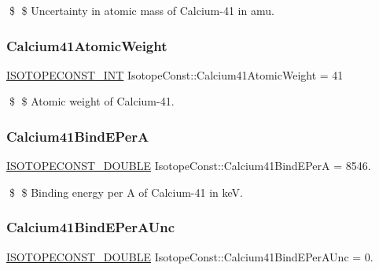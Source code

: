 \$ \$ Uncertainty in atomic mass of Calcium-\/41 in amu. \mbox{\label{group___isotope_const-_calcium-_ca41_gaae3ecc363e8c6f67dbcbed502c0ca846}} 
\subsubsection{\texorpdfstring{Calcium41\+Atomic\+Weight}{Calcium41AtomicWeight}}
{\footnotesize\ttfamily \mbox{\hyperlink{group___isotope_const-_macros_ga5f18360b3e99483a35c32d789e62621c}{I\+S\+O\+T\+O\+P\+E\+C\+O\+N\+S\+T\+\_\+\+I\+NT}} Isotope\+Const\+::\+Calcium41\+Atomic\+Weight = 41}

\$ \$ Atomic weight of Calcium-\/41. \mbox{\label{group___isotope_const-_calcium-_ca41_gabe5e98dd7c499c97761f8a2cbbdee1d8}} 
\subsubsection{\texorpdfstring{Calcium41\+Bind\+E\+PerA}{Calcium41BindEPerA}}
{\footnotesize\ttfamily \mbox{\hyperlink{group___isotope_const-_macros_ga8f45a7272ce02c0b4c65c44636ed719a}{I\+S\+O\+T\+O\+P\+E\+C\+O\+N\+S\+T\+\_\+\+D\+O\+U\+B\+LE}} Isotope\+Const\+::\+Calcium41\+Bind\+E\+PerA = 8546.}

\$ \$ Binding energy per A of Calcium-\/41 in keV. \mbox{\label{group___isotope_const-_calcium-_ca41_gaf215abbeabc06cf19bdf73a1425b06fe}} 
\subsubsection{\texorpdfstring{Calcium41\+Bind\+E\+Per\+A\+Unc}{Calcium41BindEPerAUnc}}
{\footnotesize\ttfamily \mbox{\hyperlink{group___isotope_const-_macros_ga8f45a7272ce02c0b4c65c44636ed719a}{I\+S\+O\+T\+O\+P\+E\+C\+O\+N\+S\+T\+\_\+\+D\+O\+U\+B\+LE}} Isotope\+Const\+::\+Calcium41\+Bind\+E\+Per\+A\+Unc = 0.}

